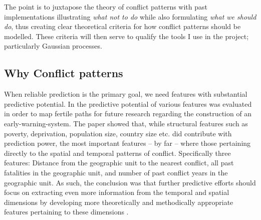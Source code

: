 \documentclass[a4paper]{article}
\begin{document}
The point is to juxtapose the theory of conflict patterns with past implementations illustrating \emph{what not to do} while also formulating \emph{what we should do}, thus creating clear theoretical criteria for how conflict patterns should be modelled. These criteria will then serve to qualify the tools I use in the project; particularly Gaussian processes.\par 



\subsection{Why Conflict patterns}

When reliable prediction is the primary goal, we need features with substantial predictive potential. In \cite{Maase} the predictive potential of various features was evaluated in order to map fertile paths for future research regarding the construction of an early-warning-system. The paper showed that, while structural features such as poverty, deprivation, population size, country size etc. did contribute with prediction power, the most important features -- by far -- where those pertaining directly to the spatial and temporal patterns of conflict. Specifically three features: Distance from the geographic unit to the nearest conflict, all past fatalities in the geographic unit, and number of past conflict years in the geographic unit\citep[17-18]{Maase}. As such, the conclusion was that further predictive efforts should focus on extracting even more information from the temporal and spatial dimensions by developing more theoretically and methodically appropriate features pertaining to these dimensions \citep[21-23]{Maase}.\par
\end{document}
